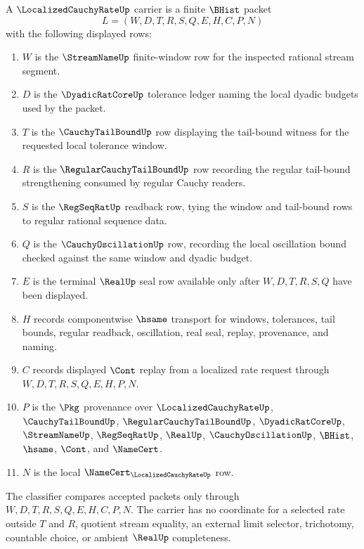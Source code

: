 \begin{definition}
\label{def:localized-cauchy-rate-carrier}
A $\LocalizedCauchyRateUp$ carrier is a finite $\BHist$ packet
$$
L=(W,D,T,R,S,Q,E,H,C,P,N)
$$
with the following displayed rows:
\begin{enumerate}
\item $W$ is the $\StreamNameUp$ finite-window row for the inspected rational stream segment.
\item $D$ is the $\DyadicRatCoreUp$ tolerance ledger naming the local dyadic budgets used by the packet.
\item $T$ is the $\CauchyTailBoundUp$ row displaying the tail-bound witness for the requested local tolerance window.
\item $R$ is the $\RegularCauchyTailBoundUp$ row recording the regular tail-bound strengthening consumed by regular Cauchy readers.
\item $S$ is the $\RegSeqRatUp$ readback row, tying the window and tail-bound rows to regular rational sequence data.
\item $Q$ is the $\CauchyOscillationUp$ row, recording the local oscillation bound checked against the same window and dyadic budget.
\item $E$ is the terminal $\RealUp$ seal row available only after $W,D,T,R,S,Q$ have been displayed.
\item $H$ records componentwise $\hsame$ transport for windows, tolerances, tail bounds, regular readback, oscillation, real seal, replay, provenance, and naming.
\item $C$ records displayed $\Cont$ replay from a localized rate request through $W,D,T,R,S,Q,E,H,P,N$.
\item $P$ is the $\Pkg$ provenance over $\LocalizedCauchyRateUp$, $\CauchyTailBoundUp$, $\RegularCauchyTailBoundUp$, $\DyadicRatCoreUp$, $\StreamNameUp$, $\RegSeqRatUp$, $\RealUp$, $\CauchyOscillationUp$, $\BHist$, $\hsame$, $\Cont$, and $\NameCert$.
\item $N$ is the local $\NameCert_{\LocalizedCauchyRateUp}$ row.
\end{enumerate}
The classifier compares accepted packets only through $W,D,T,R,S,Q,E,H,C,P,N$. The carrier has no coordinate for a selected rate outside $T$ and $R$, quotient stream equality, an external limit selector, trichotomy, countable choice, or ambient $\RealUp$ completeness.
\end{definition}

